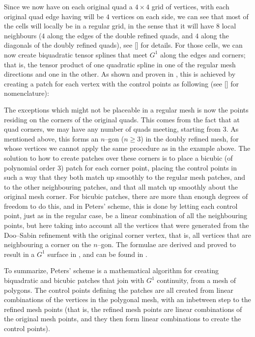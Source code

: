 Since we now have on each original quad a $4 \times 4$ grid of vertices, with each original quad edge having will be $4$ vertices on each side, we can see that most of the cells will locally be in a regular grid, in the sense that it will have $8$ local neighbours ($4$ along the edges of the double refined quads, and $4$ along the diagonals of the doubly refined quads), see [] for details. 
For those cells, we can now create biquadratic tensor splines that meet $G^1$ along the edges and corners; that is, the tensor product of one quadratic spline in one of the regular mesh directions and one in the other. As shown and proven in \cite{peters1992constructing}, this is achieved by creating a \Bez patch for each vertex with the \Bez control points as following (see [] for nomenclature):


The exceptions which might not be placeable in a regular mesh is now the points residing on the corners of the original quads. This comes from the fact that at quad corners, we may have any number of quads meeting, starting from 3.  As mentioned above, this forms an $n$--gon ($n \geq 3$) in the doubly refined mesh, for whose vertices we cannot apply the same procedure as in the example above. 
The solution to how to create \Bez patches over these corners is to place a bicubic (of polynomial order 3) \Bez patch for each corner point, placing the \Bez control points in such a way that they both match up smoothly to the regular mesh patches, and to the other neighbouring patches, and that all match up smoothly about the original mesh corner. For bicubic \Bez patches, there are more than enough degrees of freedom to do this, and in Peters' scheme, this is done by letting each \Bez control point, just as in the regular case, be a linear combination of all the neighbouring points, but here taking into account all the vertices that were generated from the Doo--Sabin refinement with the original corner vertex, that is, all vertices that are neighbouring a corner on the $n$--gon. The formulae are derived and proved to result in a $G^1$ surface in \cite{peters1992constructing}, and can be found in . 

To summarize, Peters' scheme is a mathematical algorithm for creating biquadratic and bicubic \Bez patches that join with $G^1$ continuity, from a mesh of polygons. The \Bez control points defining the patches are all created from linear combinations of the vertices in the polygonal mesh, with an inbetween step to the refined mesh points (that is, the refined mesh points are linear combinations of the original mesh points, and they then form linear combinations to create the \Bez control points).

